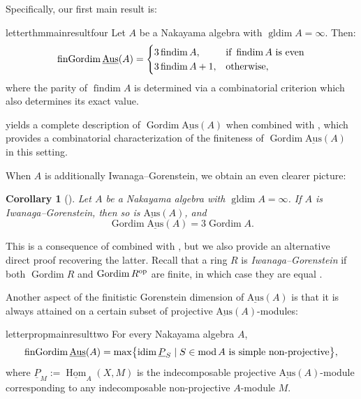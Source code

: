 \documentclass[a4paper]{amsart}
\newtheorem{lettercor}[letterthm]{Corollary}
\theoremstyle{definition}
\theoremstyle{remark}
\numberwithin{equation}{theorem}
\renewcommand{\mod}{\operatorname{mod}}
\newcommand{\findim}{\operatorname{findim}}
\newcommand{\Hom}{\operatorname{Hom}}
\newcommand{\sAus}{\operatorname{\underline{Aus}}}
\newcommand{\pstab}[1]{\underline{P}_{#1}}
\newcommand{\gordim}{\operatorname{Gordim}}
\newcommand{\fingordim}{\operatorname{finGordim}}
\newcommand{\idim}{\operatorname{idim}}
\newcommand{\gldim}{\operatorname{gldim}}
\newcommand{\op}{\textnormal{op}}
\begin{document}
Specifically, our first main result is:


\begin{restatable}{letterthm}{mainresultfour}\label{mainresult1}
Let $A$ be a Nakayama algebra with $ \gldim A = \infty $. Then:
        \[
            \fingordim \sAus(A)  =  \begin{cases}
                3 \findim A , & \text{if $ \, \findim A $ is even} \\
                3 \findim A + 1 , & \text{otherwise} ,
                    \end{cases}
        \]
        where the parity of $ \findim A $ is determined via a combinatorial criterion which also determines its exact value.
\end{restatable}



 yields a complete description of $ \gordim \sAus (A) $ when combined with , which provides a combinatorial characterization of the finiteness of $ \gordim \sAus(A) $ in this setting.



When $ A $ is additionally Iwanaga--Gorenstein, we obtain an even clearer picture:

\begin{lettercor}[]\label{lettercor}
    Let $ A $ be a Nakayama algebra with $ \gldim A = \infty $. If $A$ is Iwanaga--Gorenstein, then so is $\sAus(A)$, and
        \[
            \gordim \sAus(A) = 3\gordim A.
       \]
\end{lettercor}

This is a consequence of  combined with \cite[Remark 5.1.4]{Se}, but we also provide an alternative direct proof recovering the latter. Recall that a ring $ R $ is \emph{Iwanaga--Gorenstein} if both $ \gordim R $ and $ \gordim R^\op $ are finite, in which case they are equal \cite{Za}.


Another aspect of the finitistic Gorenstein dimension of $ \sAus(A) $ is that it is always attained on a certain subset of projective $ \sAus(A) $-modules:


\begin{restatable}{letterprop}{mainresulttwo}    \label{mainresult2}
For every Nakayama algebra $A$,
    \[
        \fingordim \sAus(A) = \max \bigl\{ \idim \pstab{S} \mid S \in \mod A \textnormal{ is simple non-projective} \bigr\}   ,
    \]
where $ \pstab{M} := \underline{\Hom}_A(X,M) $ is the indecomposable projective $ \sAus(A) $-module corresponding to any indecomposable non-projective $ A $-module $ M $.
\end{restatable}
\end{document}
